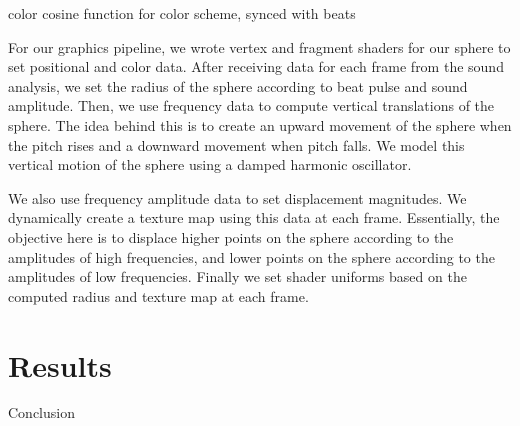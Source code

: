 \documentclass{article}
\begin{document}
color cosine function for color scheme, synced with beats

For our graphics pipeline, we wrote vertex and fragment shaders for our sphere to set positional and color data. After receiving data for each frame from the sound analysis, we set the radius of the sphere according to beat pulse and sound amplitude. Then, we use frequency data to compute vertical translations of the sphere. The idea behind this is to create an upward movement of the sphere when the pitch rises and a downward movement when pitch falls. We model this vertical motion of the sphere using a damped harmonic oscillator. 

We also use frequency amplitude data to set displacement magnitudes. We dynamically create a texture map using this data at each frame. Essentially, the objective here is to displace higher points on the sphere according to the amplitudes of high frequencies, and lower points on the sphere according to the amplitudes of low frequencies. Finally we set shader uniforms based on the computed radius and texture map at each frame.

\section{Results}

Conclusion
\end{document}
